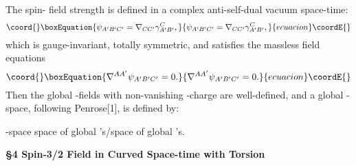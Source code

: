\documentclass[a4paper,12pt]{article}
\begin{document}
The spin-\coordHE{} field strength \coordHE{} is defined in a complex anti-self-dual vacuum space-time:
\begin{equation}\coord{}\boxEquation{
\psi_{A'B'C'}=\nabla_{CC'}\gamma^C_{A'B'},
}{
\psi_{A'B'C'}=\nabla_{CC'}\gamma^C_{A'B'},
}{ecuacion}\coordE{}\end{equation}
which is gauge-invariant, totally symmetric, and satisfies the massless field equations
\begin{equation}\coord{}\boxEquation{
\nabla^{AA'}\psi_{A'B'C'}=0.
}{
\nabla^{AA'}\psi_{A'B'C'}=0.
}{ecuacion}\coordE{}\end{equation}
Then the global \myHighlight{$\psi$}\coordHE{}-fields with non-vanishing \myHighlight{$\pi$}\coordHE{}-charge are well-defined, and a global \myHighlight{$\pi$}\coordHE{}-space, following Penrose[1], is defined by:\par
\myHighlight{$\pi$}\coordHE{}-space\myHighlight{$\equiv$}\coordHE{} space of global \myHighlight{$\psi$}\coordHE{}'s/space of global \myHighlight{$\gamma$}\coordHE{}'s.\par

\vskip 16pt
{\bf \S 4 Spin-3/2 Field in Curved Space-time with Torsion}
\vskip 16pt
\end{document}
